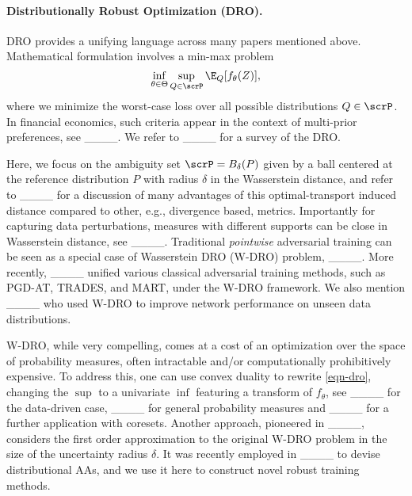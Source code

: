 \paragraph{Distributionally Robust Optimization (DRO).}
DRO provides a unifying language across many papers mentioned above. 
Mathematical formulation involves a min-max problem
\begin{equation}
    \label{eqn-dro}
    \inf_{\theta\in \Theta} \sup_{Q\in\scrP} \E_{Q}[f_{\theta}(Z)],
\end{equation}
where we minimize the worst-case loss over all possible distributions \(Q\in\scrP\). 
In financial economics, such criteria appear in the context of multi-prior preferences, see ____. We refer to ____ for a survey of the DRO. 

Here, we focus on the ambiguity set \(\scrP=B_{\delta}(P)\) given by a ball centered at the reference distribution \(P\) with radius \(\delta\) in the Wasserstein distance, and refer to ____ for a discussion of many advantages of this optimal-transport induced distance compared to other, e.g., divergence based, metrics. Importantly for capturing data perturbations, measures with different supports can be close in Wasserstein distance, see ____. Traditional \emph{pointwise} adversarial training can be seen as a special case of Wasserstein DRO (W-DRO) problem, ____.
More recently, ____ unified various classical adversarial training methods, such as PGD-AT, TRADES, and MART, under the W-DRO framework. We also mention ____ who used W-DRO to improve network performance on unseen data distributions.  

W-DRO, while very compelling, comes at a cost of an optimization over the space of probability measures, often intractable and/or computationally prohibitively expensive. To address this, one can use convex duality to rewrite \eqref{eqn-dro}, changing the $\sup$ to a univariate $\inf$ featuring a transform of $f_\theta$, see ____ for the data-driven case, ____ for general probability measures and ____ for a further application with coresets. Another approach, pioneered in ____, considers the first order approximation to the original W-DRO problem in the size of the uncertainty radius $\delta$. It was recently employed in ____ to devise distributional AAs, and we use it here to construct novel robust training methods. 

